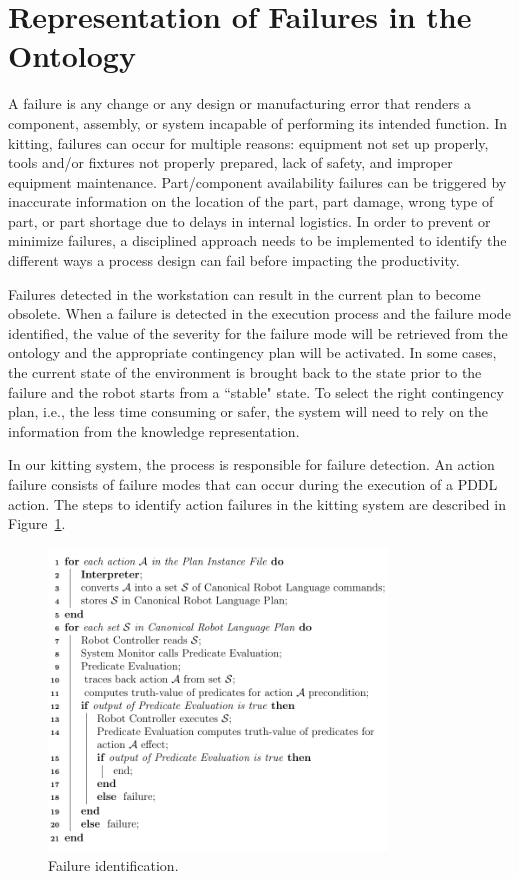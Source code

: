 \section{Representation of Failures in the Ontology}\label{task2}
A failure is any change or any design or manufacturing error that renders a component, assembly, or system incapable of performing its intended function. In kitting, failures can occur for multiple reasons: equipment not set up properly, tools and/or fixtures not properly prepared, lack of safety, and improper equipment maintenance. Part/component availability failures can be triggered by inaccurate information on the location of the part, part damage, wrong type of part, or part shortage due to delays in internal logistics. In order to prevent or minimize failures, a disciplined approach needs to be implemented to identify the different ways a process design can fail before impacting the productivity.

 Failures detected in the workstation can result in the current plan to become obsolete. When a failure is detected in the execution process and the failure mode identified, the value of the severity for the failure mode will be retrieved from the ontology and the appropriate contingency plan will be activated. In some cases, the current state of the environment is brought back to the state prior to the failure and the robot starts from a ``stable" state. To select the right contingency plan, i.e., the less time consuming or safer, the system will need to rely on the information from the knowledge representation.

In our kitting system, the  process is responsible for failure detection. An action failure consists of failure modes that can occur during the execution of a PDDL action. The steps to identify action failures in the kitting system are described in Figure~\ref{fig:algo}.

\begin{figure}[h!t!]
  \centering
  \includegraphics[width=9cm]{Figures/algorithm.pdf}
  \caption{Failure identification.}
  \label{fig:algo}
\end{figure}

